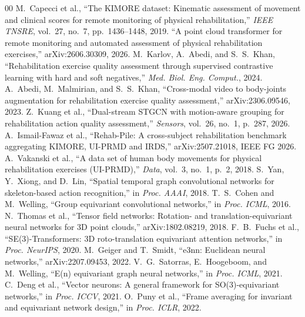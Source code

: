 \documentclass[11pt]{article}
\begin{document}
\begin{thebibliography}{00}
 M.~Capecci et al., ``The KIMORE dataset: Kinematic assessment of movement and clinical scores for remote monitoring of physical rehabilitation,'' \textit{IEEE TNSRE}, vol.~27, no.~7, pp.~1436--1448, 2019.
 ``A point cloud transformer for remote monitoring and automated assessment of physical rehabilitation exercises,'' arXiv:2606.30309, 2026.
 M.~Karlov, A.~Abedi, and S.~S.~Khan, ``Rehabilitation exercise quality assessment through supervised contrastive learning with hard and soft negatives,'' \textit{Med. Biol. Eng. Comput.}, 2024.
 A.~Abedi, M.~Malmirian, and S.~S.~Khan, ``Cross-modal video to body-joints augmentation for rehabilitation exercise quality assessment,'' arXiv:2306.09546, 2023.
 Z.~Kuang et al., ``Dual-stream STGCN with motion-aware grouping for rehabilitation action quality assessment,'' \textit{Sensors}, vol.~26, no.~1, p.~287, 2026.
 A.~Ismail-Fawaz et al., ``Rehab-Pile: A cross-subject rehabilitation benchmark aggregating KIMORE, UI-PRMD and IRDS,'' arXiv:2507.21018, IEEE FG 2026.
 A.~Vakanski et al., ``A data set of human body movements for physical rehabilitation exercises (UI-PRMD),'' \textit{Data}, vol.~3, no.~1, p.~2, 2018.
 S.~Yan, Y.~Xiong, and D.~Lin, ``Spatial temporal graph convolutional networks for skeleton-based action recognition,'' in \textit{Proc. AAAI}, 2018.
 T.~S.~Cohen and M.~Welling, ``Group equivariant convolutional networks,'' in \textit{Proc. ICML}, 2016.
 N.~Thomas et al., ``Tensor field networks: Rotation- and translation-equivariant neural networks for 3D point clouds,'' arXiv:1802.08219, 2018.
 F.~B.~Fuchs et al., ``SE(3)-Transformers: 3D roto-translation equivariant attention networks,'' in \textit{Proc. NeurIPS}, 2020.
 M.~Geiger and T.~Smidt, ``e3nn: Euclidean neural networks,'' arXiv:2207.09453, 2022.
 V.~G.~Satorras, E.~Hoogeboom, and M.~Welling, ``E(n) equivariant graph neural networks,'' in \textit{Proc. ICML}, 2021.
 C.~Deng et al., ``Vector neurons: A general framework for SO(3)-equivariant networks,'' in \textit{Proc. ICCV}, 2021.
 O.~Puny et al., ``Frame averaging for invariant and equivariant network design,'' in \textit{Proc. ICLR}, 2022.

\end{thebibliography}
\end{document}
